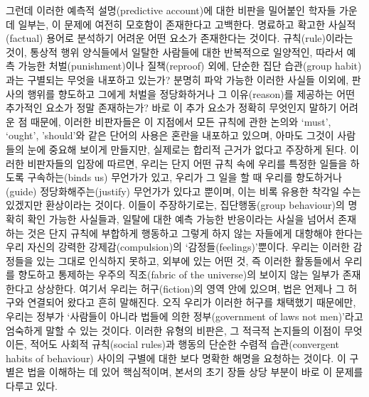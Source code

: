 그런데 이러한 예측적 설명(predictive account)에 대한 비판을 밀어붙인
학자들 가운데 일부는, 이 문제에 여전히 모호함이 존재한다고 고백한다.
명료하고 확고한 사실적(factual) 용어로 분석하기 어려운 어떤 요소가
존재한다는 것이다. 규칙(rule)이라는 것이, 통상적 행위 양식들에서 일탈한
사람들에 대한 반복적으로 일양적인, 따라서 예측 가능한
처벌(punishment)이나 질책(reproof) 외에, 단순한 집단 습관(group
habit)과는 구별되는 무엇을 내포하고  있는가? 분명히
파악 가능한 이러한 사실들 이외에, 판사의 행위를 향도하고 그에게 처벌을
정당화하거나 그 이유(reason)를 제공하는 어떤 추가적인 요소가 정말
존재하는가? 바로 이 추가 요소가 정확히 무엇인지 말하기 어려운 점 때문에,
이러한 비판자들은 이 지점에서 모든 규칙에 관한 논의와 `must', `ought',
'should'와 같은 단어의 사용은 혼란을 내포하고 있으며, 아마도 그것이
사람들의 눈에 중요해 보이게 만들지만, 실제로는 합리적 근거가 없다고
주장하게 된다. 이러한 비판자들의 입장에 따르면, 우리는 단지 어떤 규칙
속에 우리를 특정한 일들을 하도록 구속하는(binds us) 무언가가 있고,
우리가 그 일을 할 때 우리를 향도하거나(guide) 정당화해주는(justify)
무언가가 있다고  뿐이며, 이는 비록 유용한 착각일
수는 있겠지만 환상이라는 것이다. 이들이 주장하기로는, 집단행동(group
behaviour)의 명확히 확인 가능한 사실들과, 일탈에 대한 예측 가능한
반응이라는 사실을 넘어서 존재하는 것은 단지 규칙에 부합하게 행동하고
그렇게 하지 않는 자들에게 대항해야 한다는 우리 자신의 강력한
강제감(compulsion)의 ‘감정들(feelings)’뿐이다. 우리는 이러한 감정들을
있는 그대로 인식하지 못하고, 외부에 있는 어떤 것, 즉 이러한 활동들에서
우리를 향도하고 통제하는 우주의 직조(fabric of the universe)의 보이지
않는 일부가 존재한다고 상상한다. 여기서 우리는 허구(fiction)의 영역 안에
있으며, 법은 언제나 그 허구와 연결되어 왔다고 흔히 말해진다. 오직 우리가
이러한 허구를 채택했기 때문에만, 우리는 정부가 ‘사람들이 아니라 법들에
의한 정부(government of laws not men)’라고 엄숙하게 말할 수 있는 것이다.
이러한 유형의 비판은, 그 적극적 논지들의 이점이 무엇이든, 적어도 사회적
규칙(social rules)과 행동의 단순한 수렴적 습관(convergent habits of
behaviour) 사이의 구별에 대한 보다 명확한 해명을 요청하는 것이다. 이
구별은 법을 이해하는 데 있어 핵심적이며, 본서의 초기 장들 상당 부분이
바로 이 문제를 다루고 있다.

